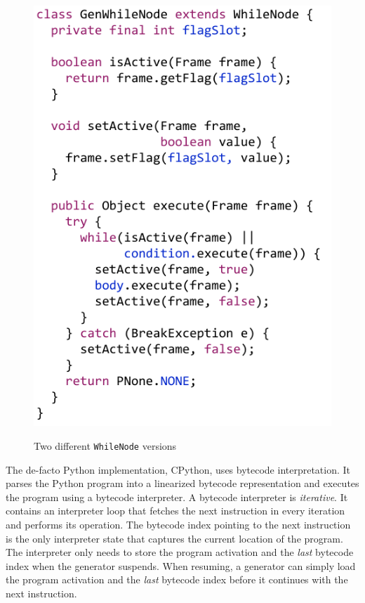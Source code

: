 \begin{figure}
{	\includegraphics[scale=.9]{figures/ch4-gen-while-node-code}
	\label{fig:ch4-gen-while-node-code}
}
\caption{Two different \texttt{WhileNode} versions}
\label{fig:ch4-while-nodes}
\end{figure}

The de-facto Python implementation, CPython, uses bytecode interpretation.
It parses the Python program into a linearized bytecode representation and executes the program using a bytecode interpreter.
A bytecode interpreter is \emph{iterative}.
It contains an interpreter loop that fetches the next instruction in every iteration and performs its operation.
The bytecode index pointing to the next instruction is the only interpreter state that captures the current location of the program.
The interpreter only needs to store the program activation and the \emph{last} bytecode index when the generator suspends.
When resuming, a generator can simply load the program activation and the \emph{last} bytecode index before it continues with the next instruction.

